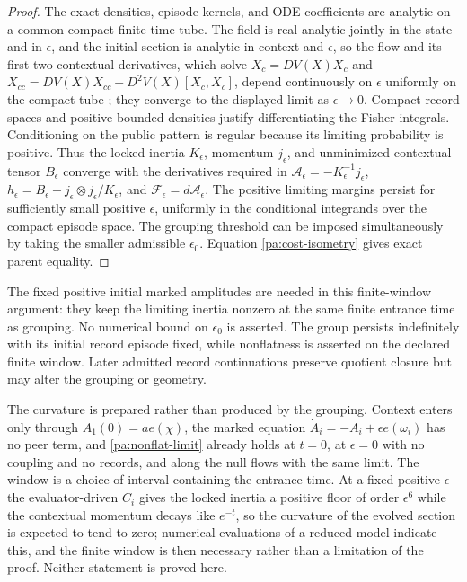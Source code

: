 \begin{proof}
The exact densities, episode kernels, and ODE coefficients are analytic on a common compact finite-time tube. The field is real-analytic jointly in the state and in $\epsilon$, and the initial section is analytic in context and $\epsilon$, so the flow and its first two contextual derivatives, which solve
$\dot X_c=DV(X)X_c$ and
$\dot X_{cc}=DV(X)X_{cc}+D^2V(X)[X_c,X_c]$,
depend continuously on $\epsilon$ uniformly on the compact tube \citep[Chapter V]{Hartman2002}; they converge to the displayed limit as $\epsilon\to0$. Compact record spaces and positive bounded densities justify differentiating the Fisher integrals. Conditioning on the public pattern is regular because its limiting probability is positive. Thus the locked inertia $K_\epsilon$, momentum $j_\epsilon$, and unminimized contextual tensor $B_\epsilon$ converge with the derivatives required in
$\mathcal A_\epsilon=-K_\epsilon^{-1}j_\epsilon$,
$h_\epsilon=B_\epsilon-j_\epsilon\otimes j_\epsilon/K_\epsilon$,
and $\mathcal F_\epsilon=d\mathcal A_\epsilon$.
The positive limiting margins persist for sufficiently small positive $\epsilon$, uniformly in the conditional integrands over the compact episode space. The grouping threshold can be imposed simultaneously by taking the smaller admissible $\epsilon_0$. Equation \cref{pa:cost-isometry} gives exact parent equality.
\end{proof}

The fixed positive initial marked amplitudes are needed in this finite-window argument: they keep the limiting inertia nonzero at the same finite entrance time as grouping. No numerical bound on $\epsilon_0$ is asserted. The group persists indefinitely with its initial record episode fixed, while nonflatness is asserted on the declared finite window. Later admitted record continuations preserve quotient closure but may alter the grouping or geometry.

The curvature is prepared rather than produced by the grouping. Context enters only through $A_1(0)=ae(\chi)$, the marked equation $\dot A_i=-A_i+\epsilon e(\omega_i)$ has no peer term, and \cref{pa:nonflat-limit} already holds at $t=0$, at $\epsilon=0$ with no coupling and no records, and along the null flows with the same limit. The window is a choice of interval containing the entrance time. At a fixed positive $\epsilon$ the evaluator-driven $C_i$ gives the locked inertia a positive floor of order $\epsilon^6$ while the contextual momentum decays like $e^{-t}$, so the curvature of the evolved section is expected to tend to zero; numerical evaluations of a reduced model indicate this, and the finite window is then necessary rather than a limitation of the proof. Neither statement is proved here.

